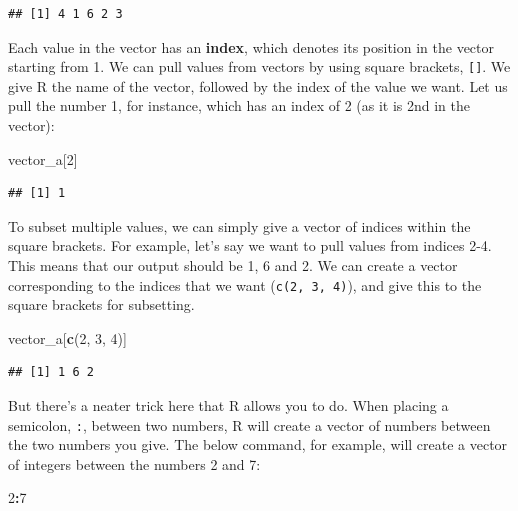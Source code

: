 \documentclass[
]{book}
\newenvironment{Shaded}{\begin{snugshade}}{\end{snugshade}}
\newcommand{\DecValTok}[1]{\textcolor[rgb]{0.00,0.00,0.81}{#1}}
\newcommand{\FunctionTok}[1]{\textcolor[rgb]{0.13,0.29,0.53}{\textbf{#1}}}
\newcommand{\NormalTok}[1]{#1}
\newcommand{\SpecialCharTok}[1]{\textcolor[rgb]{0.81,0.36,0.00}{\textbf{#1}}}
\begin{document}
\begin{verbatim}
## [1] 4 1 6 2 3
\end{verbatim}

Each value in the vector has an \textbf{index}, which denotes its position in the vector starting from 1. We can pull values from vectors by using square brackets, \texttt{{[}{]}}. We give R the name of the vector, followed by the index of the value we want. Let us pull the number 1, for instance, which has an index of 2 (as it is 2nd in the vector):

\begin{Shaded}
\begin{Highlighting}[]
\NormalTok{vector\_a[}\DecValTok{2}\NormalTok{]}
\end{Highlighting}
\end{Shaded}

\begin{verbatim}
## [1] 1
\end{verbatim}

To subset multiple values, we can simply give a vector of indices within the square brackets. For example, let's say we want to pull values from indices 2-4. This means that our output should be 1, 6 and 2. We can create a vector corresponding to the indices that we want (\texttt{c(2,\ 3,\ 4)}), and give this to the square brackets for subsetting.

\begin{Shaded}
\begin{Highlighting}[]
\NormalTok{vector\_a[}\FunctionTok{c}\NormalTok{(}\DecValTok{2}\NormalTok{, }\DecValTok{3}\NormalTok{, }\DecValTok{4}\NormalTok{)]}
\end{Highlighting}
\end{Shaded}

\begin{verbatim}
## [1] 1 6 2
\end{verbatim}

But there's a neater trick here that R allows you to do. When placing a semicolon, \texttt{:}, between two numbers, R will create a vector of numbers between the two numbers you give. The below command, for example, will create a vector of integers between the numbers 2 and 7:

\begin{Shaded}
\begin{Highlighting}[]
\DecValTok{2}\SpecialCharTok{:}\DecValTok{7}
\end{Highlighting}
\end{Shaded}
\end{document}
